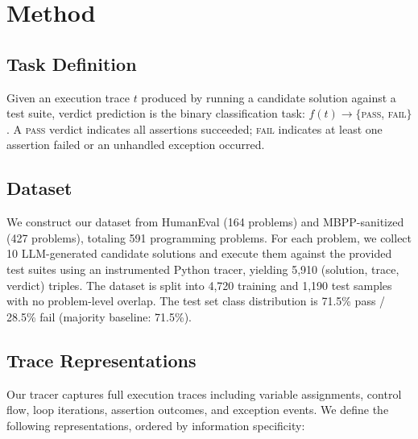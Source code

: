 \documentclass[11pt,a4paper]{article}
\begin{document}
\section{Method}

\subsection{Task Definition}

Given an execution trace $t$ produced by running a candidate solution against a test suite, verdict prediction is the binary classification task: $f(t) \to \{$\textsc{pass}, \textsc{fail}$\}$. A \textsc{pass} verdict indicates all assertions succeeded; \textsc{fail} indicates at least one assertion failed or an unhandled exception occurred.

\subsection{Dataset}

We construct our dataset from HumanEval (164 problems) and MBPP-sanitized (427 problems), totaling 591 programming problems. For each problem, we collect 10 LLM-generated candidate solutions and execute them against the provided test suites using an instrumented Python tracer, yielding 5,910 (solution, trace, verdict) triples. The dataset is split into 4,720 training and 1,190 test samples with no problem-level overlap. The test set class distribution is 71.5\% pass / 28.5\% fail (majority baseline: 71.5\%).

\subsection{Trace Representations}

Our tracer captures full execution traces including variable assignments, control flow, loop iterations, assertion outcomes, and exception events. We define the following representations, ordered by information specificity:
\end{document}
